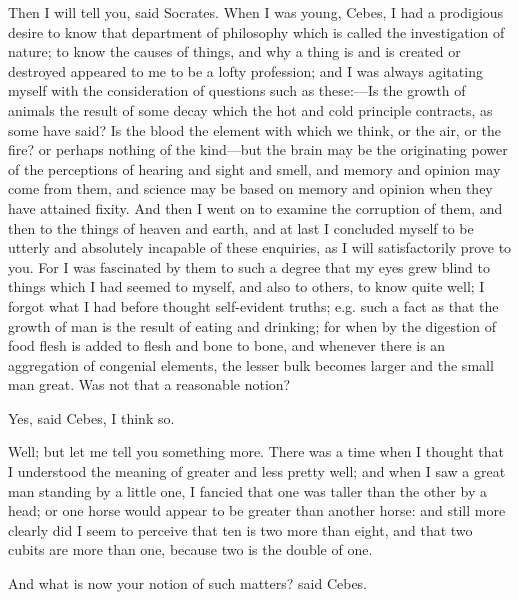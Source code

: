 \documentclass[11pt,letter]{article}
\begin{document}
\par  Then I will tell you, said Socrates. When I was young, Cebes, I had a prodigious desire to know that department of philosophy which is called the investigation of nature; to know the causes of things, and why a thing is and is created or destroyed appeared to me to be a lofty profession; and I was always agitating myself with the consideration of questions such as these:—Is the growth of animals the result of some decay which the hot and cold principle contracts, as some have said? Is the blood the element with which we think, or the air, or the fire? or perhaps nothing of the kind—but the brain may be the originating power of the perceptions of hearing and sight and smell, and memory and opinion may come from them, and science may be based on memory and opinion when they have attained fixity. And then I went on to examine the corruption of them, and then to the things of heaven and earth, and at last I concluded myself to be utterly and absolutely incapable of these enquiries, as I will satisfactorily prove to you. For I was fascinated by them to such a degree that my eyes grew blind to things which I had seemed to myself, and also to others, to know quite well; I forgot what I had before thought self-evident truths; e.g. such a fact as that the growth of man is the result of eating and drinking; for when by the digestion of food flesh is added to flesh and bone to bone, and whenever there is an aggregation of congenial elements, the lesser bulk becomes larger and the small man great. Was not that a reasonable notion?

\par  Yes, said Cebes, I think so.

\par  Well; but let me tell you something more. There was a time when I thought that I understood the meaning of greater and less pretty well; and when I saw a great man standing by a little one, I fancied that one was taller than the other by a head; or one horse would appear to be greater than another horse: and still more clearly did I seem to perceive that ten is two more than eight, and that two cubits are more than one, because two is the double of one.

\par  And what is now your notion of such matters? said Cebes.
\end{document}

